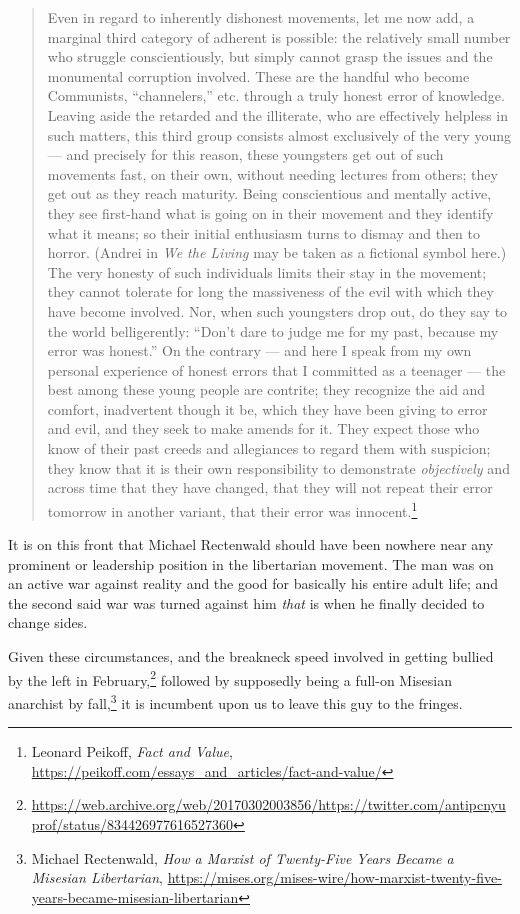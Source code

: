 \documentclass[11pt]{article}
\begin{document}
\begin{quote}
Even in regard to inherently dishonest movements, let me now add, a marginal third category of adherent is possible: the relatively small number who struggle conscientiously, but simply cannot grasp the issues and the monumental corruption involved. These are the handful who become Communists, “channelers,” etc. through a truly honest error of knowledge. Leaving aside the retarded and the illiterate, who are effectively helpless in such matters, this third group consists almost exclusively of the very young --- and precisely for this reason, these youngsters get out of such movements fast, on their own, without needing lectures from others; they get out as they reach maturity. Being conscientious and mentally active, they see first-hand what is going on in their movement and they identify what it means; so their initial enthusiasm turns to dismay and then to horror. (Andrei in \emph{We the Living} may be taken as a fictional symbol here.) The very honesty of such individuals limits their stay in the movement; they cannot tolerate for long the massiveness of the evil with which they have become involved. Nor, when such youngsters drop out, do they say to the world belligerently: “Don’t dare to judge me for my past, because my error was honest.” On the contrary --- and here I speak from my own personal experience of honest errors that I committed as a teenager --- the best among these young people are contrite; they recognize the aid and comfort, inadvertent though it be, which they have been giving to error and evil, and they seek to make amends for it. They expect those who know of their past creeds and allegiances to regard them with suspicion; they know that it is their own responsibility to demonstrate \emph{objectively} and across time that they have changed, that they will not repeat their error tomorrow in another variant, that their error was innocent.\footnote{Leonard Peikoff, \emph{Fact and Value}, \url{https://peikoff.com/essays\_and\_articles/fact-and-value/}}
\end{quote}

It is on this front that Michael Rectenwald should have been nowhere near any prominent or leadership position in the libertarian movement. The man was on an active war against reality and the good for basically his entire adult life; and the second said war was turned against him \emph{that} is when he finally decided to change sides.

Given these circumstances, and the breakneck speed involved in getting bullied by the left in February,\footnote{\url{https://web.archive.org/web/20170302003856/https://twitter.com/antipcnyuprof/status/834426977616527360}} followed by supposedly being a full-on Misesian anarchist by fall,\footnote{Michael Rectenwald, \emph{How a Marxist of Twenty-Five Years Became a Misesian Libertarian}, \url{https://mises.org/mises-wire/how-marxist-twenty-five-years-became-misesian-libertarian}} it is incumbent upon us to leave this guy to the fringes.
\end{document}
